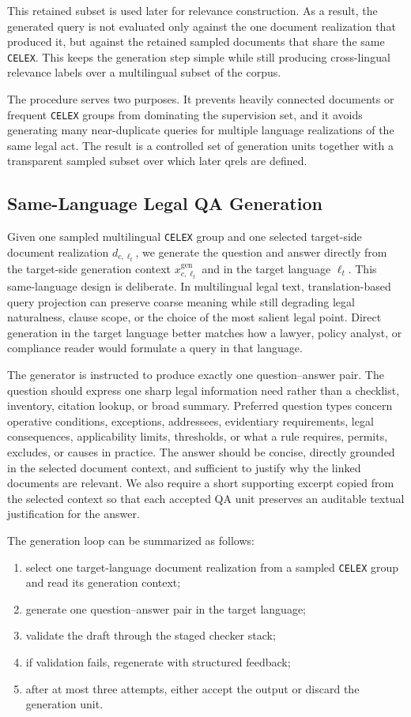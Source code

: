 This retained subset is used later for relevance construction. As a result, the generated query is not evaluated only against the one document realization that produced it, but against the retained sampled documents that share the same \texttt{CELEX}. This keeps the generation step simple while still producing cross-lingual relevance labels over a multilingual subset of the corpus.

The procedure serves two purposes. It prevents heavily connected documents or frequent \texttt{CELEX} groups from dominating the supervision set, and it avoids generating many near-duplicate queries for multiple language realizations of the same legal act. The result is a controlled set of generation units together with a transparent sampled subset over which later qrels are defined.

\subsection{Same-Language Legal QA Generation}

Given one sampled multilingual \texttt{CELEX} group and one selected target-side document realization \(d_{c,\ell_t}\), we generate the question and answer directly from the target-side generation context \(x^{\mathrm{gen}}_{c,\ell_t}\) and in the target language \(\ell_t\). This same-language design is deliberate. In multilingual legal text, translation-based query projection can preserve coarse meaning while still degrading legal naturalness, clause scope, or the choice of the most salient legal point. Direct generation in the target language better matches how a lawyer, policy analyst, or compliance reader would formulate a query in that language.

The generator is instructed to produce exactly one question--answer pair. The question should express one sharp legal information need rather than a checklist, inventory, citation lookup, or broad summary. Preferred question types concern operative conditions, exceptions, addressees, evidentiary requirements, legal consequences, applicability limits, thresholds, or what a rule requires, permits, excludes, or causes in practice. The answer should be concise, directly grounded in the selected document context, and sufficient to justify why the linked documents are relevant. We also require a short supporting excerpt copied from the selected context so that each accepted QA unit preserves an auditable textual justification for the answer.

The generation loop can be summarized as follows:
\begin{enumerate}
\item select one target-language document realization from a sampled \texttt{CELEX} group and read its generation context;
\item generate one question--answer pair in the target language;
\item validate the draft through the staged checker stack;
\item if validation fails, regenerate with structured feedback;
\item after at most three attempts, either accept the output or discard the generation unit.
\end{enumerate}

